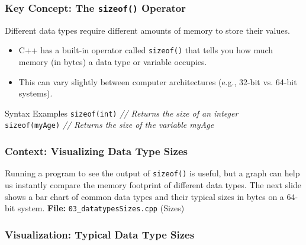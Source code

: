 \documentclass{beamer}
\begin{document}
\begin{frame}
\frametitle{Key Concept: The \texttt{sizeof()} Operator}
Different data types require different amounts of memory to store their values.

\begin{itemize}
    \item C++ has a built-in operator called \texttt{sizeof()} that tells you how much memory (in \alert{bytes}) a data type or variable occupies.
    \item This can vary slightly between computer architectures (e.g., 32-bit vs. 64-bit systems).
\end{itemize}
\pause
\begin{block}{Syntax Examples}
\texttt{sizeof(int)} \hfill \textit{// Returns the size of an integer} \\
\texttt{sizeof(myAge)} \hfill \textit{// Returns the size of the variable myAge}
\end{block}
\end{frame}

\begin{frame}
\frametitle{Context: Visualizing Data Type Sizes}
Running a program to see the output of \texttt{sizeof()} is useful, but a graph can help us instantly compare the memory footprint of different data types. The next slide shows a bar chart of common data types and their typical sizes in bytes on a 64-bit system.
\alert{
\textbf{File:} \texttt{03\_datatypesSizes.cpp} (Sizes)}
\end{frame}

\begin{frame}
\frametitle{Visualization: Typical Data Type Sizes}
\begin{figure}
\end{figure}
\end{frame}
\end{document}
